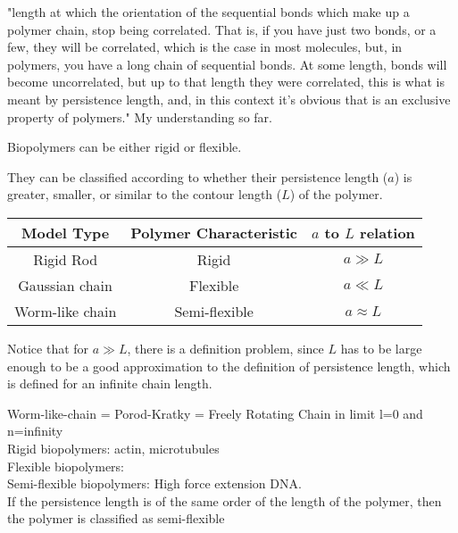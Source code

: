 "length at which the orientation of the sequential bonds which make
up a polymer chain, stop being correlated. That is, if you have just
two bonds, or a few, they will be correlated, which is the case in most
molecules, but, in polymers, you have a long chain of sequential
bonds. At some length, bonds will become uncorrelated, but up to that
length they were correlated, this is what is meant by persistence
length, and, in this context it's obvious that is an exclusive
property of polymers." My understanding so far.






Biopolymers can be either rigid or flexible. 

They can be classified  according to whether their persistence length ($a$)
is greater, smaller, or similar to the contour length ($L$) of the polymer.

\begin{table}[htbp]
\begin{center}  
\begin{tabular}{c|c|c}
\hline
Model Type      & Polymer Characteristic & $a$ to $L$ relation\\ \hline
Rigid Rod       & Rigid          &        $a \gg L$   \\
Gaussian chain  & Flexible       &        $a \ll L$   \\
Worm-like chain & Semi-flexible  &    $a \approx L$ \\
\hline
\end{tabular}
\end{center}
\end{table}
Notice that for $a \gg L$, there is a definition problem, since $L$
has to be large enough to be a good approximation to the definition of
persistence length, which is defined for an infinite chain length.





Worm-like-chain = Porod-Kratky = Freely Rotating Chain in limit l=0
and n=infinity
\\

Rigid biopolymers:
actin, microtubules
\\

Flexible biopolymers:
\\

Semi-flexible biopolymers:
High force extension DNA.
\\

If the persistence length is of the same order of the length of the
polymer, then the polymer is classified as  semi-flexible


